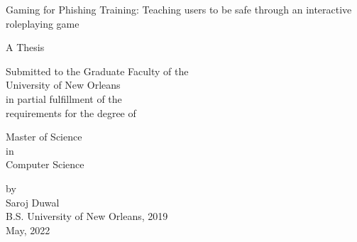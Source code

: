\providecommand{\tabularnewline}{\\}

\begin{titlepage}
    \begin{center}\large
        Gaming for Phishing Training: Teaching users to be safe through an interactive roleplaying game
        \vspace{5em}

        A Thesis

        \vspace{5em}

        \begin{singlespace}

            Submitted to the Graduate Faculty of the  \\
            University of New Orleans \\
            in partial fulfillment of the \\
            requirements for the degree of
        \end{singlespace}

        \vspace{5em}
        \begin{singlespace}
            Master of Science \\
            in \\
            Computer Science
        \end{singlespace}

        \vspace{5em}
        \par\end{center}
    \begin{center}\large
        \hspace{12pt} by \\
        \hspace{12pt} Saroj Duwal \\
        \hspace{12pt} B.S. University of New Orleans, 2019 \\
        \hspace{12pt} May, 2022\\


        \par\end{center}
\end{titlepage}
\pagebreak{}
\clearpage
\setcounter{page}{2}


